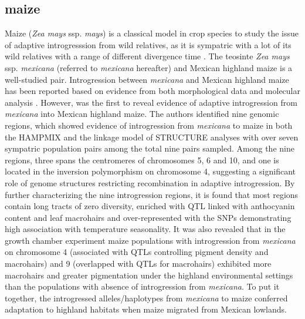 \documentclass[11pt]{article}
\begin{document}
\subsection{maize}
Maize (\emph{Zea mays} ssp. \emph{mays}) is a classical model in crop species to study the issue of adaptive introgresssion from wild relatives, as it is sympatric with a lot of its wild relatives with a range of different divergence time \cite{hufford2013}.
The teosinte \emph{Zea mays} ssp. \emph{mexicana} (referred to \emph{mexicana} hereafter) and Mexican highland maize is a well-studied pair.
Introgression between \emph{mexicana} and Mexican highland maize has been reported based on evidence from both morphological data \cite {wilkes1977, lauter2004, doebley1984} and molecular analysis \cite{matsuoka2002, vanHeerwaarden2011, doebley1987, warburton2011, fukunaga2005}.
However, \citep{hufford2013} was the first to reveal evidence of adaptive introgression from \emph{mexicana} into Mexican highland maize.
The authors identified nine genomic regions, which showed evidence of introgression from \emph{mexicana} to maize in both the HAMPMIX and the linkage model of STRUCTURE analyses with over seven sympatric population pairs among the total nine pairs sampled.
Among the nine regions, three spans the centromeres of chromosomes 5, 6 and 10, and one is located in the inversion polymorphism on chromosome 4, suggesting a significant role of genome structures restricting recombination in adaptive introgression.
By further characterizing the nine introgression regions, it is found that most regions contain long tracts of zero diversity, enriched with QTL linked with anthocyanin content and leaf macrohairs \cite{lauter2004} and over-represented with the SNPs demonstrating high association with temperature seasonality.
It was also revealed that in the growth chamber experiment maize populations with introgression from \emph{mexicana} on chromosome 4 (associated with QTLs controlling pigment density and macrohairs) and 9 (overlapped with QTLs for macrohairs) exhibited more macrohairs and greater pigmentation under the highland environmental settings than the populations with absence of introgression from \emph{mexicana}.
To put it together, the introgressed alleles/haplotypes from \emph{mexicana} to maize conferred adaptation to highland habitats when maize migrated from Mexican lowlands.
\end{document}
